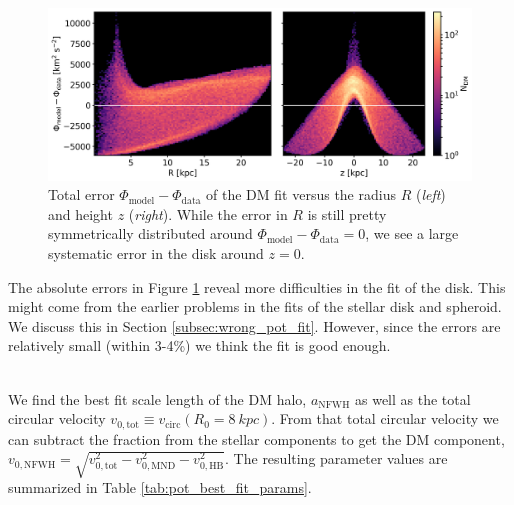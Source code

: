 \begin{figure}
\captionsetup{format=plain}
    \centering
    \includegraphics[width=\textwidth]{plots/Auriga/total_phi_error_snap_127.png}
    \caption{Total error $\Phi_\mathrm{model} - \Phi_\mathrm{data}$ of the \ac{DM} fit versus the radius $R$ (\textit{left}) and height $z$ (\textit{right}). While the error in $R$ is still pretty symmetrically distributed around $\Phi_\mathrm{model} - \Phi_\mathrm{data} = 0$, we see a large systematic error in the disk around $z=0$.}
    \label{fig:potential_fit_abs_errors}
\end{figure}
The absolute errors in Figure \ref{fig:potential_fit_abs_errors} reveal more difficulties in the fit of the disk. This might come from the earlier problems in the fits of the stellar disk and spheroid. We discuss this in Section \ref{subsec:wrong_pot_fit}. However, since the errors are relatively small (within 3-4\%) we think the fit is good enough. 

\\We find the best fit scale length of the \ac{DM} halo, $a_{\mathrm{NFWH}}$ as well as the total circular velocity $v_{0,\mathrm{tot}} \equiv v_{\mathrm{circ}}(R_0 = \SI{8}{kpc}) $. From that total circular velocity we can subtract the fraction from the stellar components to get the \ac{DM} component, $v_{0,\mathrm{NFWH}} = \sqrt{v_{0,\mathrm{tot}}^2 - v_{0, \mathrm{MND}}^2 - v_{0, \mathrm{HB}}^2}$. The resulting parameter values are summarized in Table \ref{tab:pot_best_fit_params}. 
